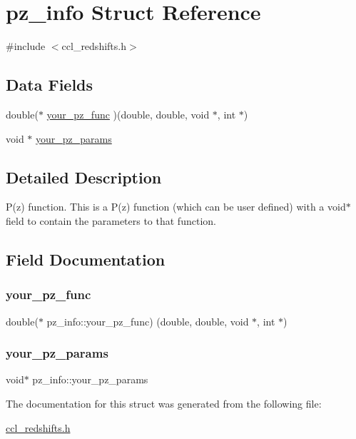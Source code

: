\hypertarget{structpz__info}{}\section{pz\+\_\+info Struct Reference}
\label{structpz__info}


{\ttfamily \#include $<$ccl\+\_\+redshifts.\+h$>$}

\subsection*{Data Fields}
\begin{DoxyCompactItemize}
\item 
double($\ast$ \mbox{\hyperlink{structpz__info_a9ffc35097b7d9bd3dee298991f750a1a}{your\+\_\+pz\+\_\+func}} )(double, double, void $\ast$, int $\ast$)
\item 
void $\ast$ \mbox{\hyperlink{structpz__info_a8ca7c69c664628da1d8ac4ed445293a7}{your\+\_\+pz\+\_\+params}}
\end{DoxyCompactItemize}


\subsection{Detailed Description}
P(z) function. This is a P(z) function (which can be user defined) with a void$\ast$ field to contain the parameters to that function. 

\subsection{Field Documentation}
\mbox{\label{structpz__info_a9ffc35097b7d9bd3dee298991f750a1a}} 
\subsubsection{\texorpdfstring{your\+\_\+pz\+\_\+func}{your\_pz\_func}}
{\footnotesize\ttfamily double($\ast$  pz\+\_\+info\+::your\+\_\+pz\+\_\+func) (double, double, void $\ast$, int $\ast$)}

\mbox{\label{structpz__info_a8ca7c69c664628da1d8ac4ed445293a7}} 
\subsubsection{\texorpdfstring{your\+\_\+pz\+\_\+params}{your\_pz\_params}}
{\footnotesize\ttfamily void$\ast$ pz\+\_\+info\+::your\+\_\+pz\+\_\+params}



The documentation for this struct was generated from the following file\+:\begin{DoxyCompactItemize}
\item 
\mbox{\hyperlink{ccl__redshifts_8h}{ccl\+\_\+redshifts.\+h}}\end{DoxyCompactItemize}
